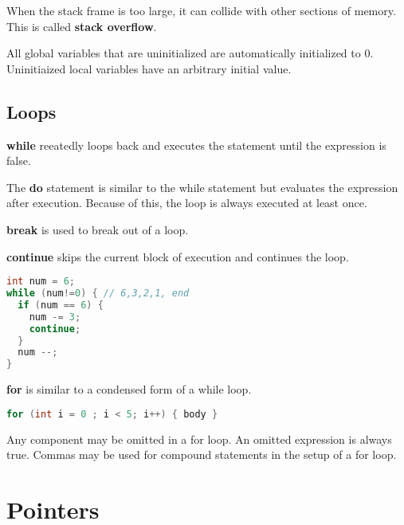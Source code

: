 \documentclass[english, 12pt]{article}
\begin{document}
\begin{defn}
When the stack frame is too large, it can collide with other sections of memory. This is called \textbf{stack overflow}.
\end{defn}

\begin{qte}
All global variables that are uninitialized are automatically initialized to 0. Uninitiaized local variables have an arbitrary initial value.
\end{qte}

\subsection{Loops}
\begin{defn}
\textbf{while} reeatedly loops back and executes the statement until the expression is false.
\end{defn}

\begin{defn}
The \textbf{do} statement is similar to the while statement but evaluates the expression after execution. Because of this, the loop is always executed at least once.
\end{defn}

\begin{defn}
\textbf{break} is used to break out of a loop.
\end{defn}

\begin{defn}
\textbf{continue} skips the current block of execution and continues the loop.
\end{defn}

\begin{lstlisting}[language=C]
int num = 6;
while (num!=0) { // 6,3,2,1, end
  if (num == 6) {
    num -= 3;
    continue;
  }
  num --;
}
\end{lstlisting}

\begin{defn}
\textbf{for} is similar to a condensed form of a while loop.
\begin{lstlisting}[language=C]
for (int i = 0 ; i < 5; i++) { body }
\end{lstlisting}
Any component may be omitted in a for loop. An omitted expression is always true. Commas may be used for compound statements in the setup of a for loop.
\end{defn}

\section{Pointers}
\end{document}

